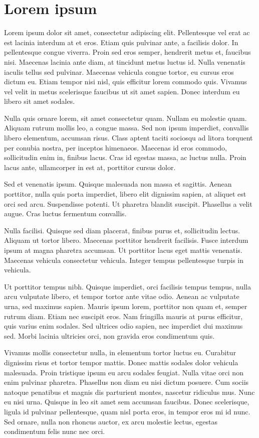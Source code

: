 \chapter{Lorem ipsum}


Lorem ipsum dolor sit amet, consectetur adipiscing elit. Pellentesque vel erat ac est lacinia interdum at et eros. Etiam quis pulvinar ante, a facilisis dolor. In pellentesque congue viverra. Proin sed eros semper, hendrerit metus et, faucibus nisi. Maecenas lacinia ante diam, at tincidunt metus luctus id. Nulla venenatis iaculis tellus sed pulvinar. Maecenas vehicula congue tortor, eu cursus eros dictum eu. Etiam tempor nisi nisl, quis efficitur lorem commodo quis. Vivamus vel velit in metus scelerisque faucibus ut sit amet sapien. Donec interdum eu libero sit amet sodales.

Nulla quis ornare lorem, sit amet consectetur quam. Nullam eu molestie quam. Aliquam rutrum mollis leo, a congue massa. Sed non ipsum imperdiet, convallis libero elementum, accumsan risus. Class aptent taciti sociosqu ad litora torquent per conubia nostra, per inceptos himenaeos. Maecenas id eros commodo, sollicitudin enim in, finibus lacus. Cras id egestas massa, ac luctus nulla. Proin lacus ante, ullamcorper in est at, porttitor cursus dolor.

Sed et venenatis ipsum. Quisque malesuada non massa et sagittis. Aenean porttitor, nulla quis porta imperdiet, libero elit dignissim sapien, at aliquet est orci sed arcu. Suspendisse potenti. Ut pharetra blandit suscipit. Phasellus a velit augue. Cras luctus fermentum convallis.

Nulla facilisi. Quisque sed diam placerat, finibus purus et, sollicitudin lectus. Aliquam ut tortor libero. Maecenas porttitor hendrerit facilisis. Fusce interdum ipsum at magna pharetra accumsan. Ut porttitor lacus eget mattis venenatis. Maecenas vehicula consectetur vehicula. Integer tempus pellentesque turpis in vehicula.

Ut porttitor tempus nibh. Quisque imperdiet, orci facilisis tempus tempus, nulla arcu vulputate libero, et tempor tortor ante vitae odio. Aenean ac vulputate urna, sed maximus sapien. Mauris ipsum lorem, porttitor non quam et, semper rutrum diam. Etiam nec suscipit eros. Nam fringilla mauris at purus efficitur, quis varius enim sodales. Sed ultrices odio sapien, nec imperdiet dui maximus sed. Morbi lacinia ultricies orci, non gravida eros condimentum quis.

Vivamus mollis consectetur nulla, in elementum tortor luctus eu. Curabitur dignissim risus et tortor tempor mattis. Donec mattis sodales dolor vehicula malesuada. Proin tristique ipsum eu arcu sodales feugiat. Nulla vitae orci non enim pulvinar pharetra. Phasellus non diam eu nisi dictum posuere. Cum sociis natoque penatibus et magnis dis parturient montes, nascetur ridiculus mus. Nunc eu nisi urna. Quisque in leo sit amet sem accumsan faucibus. Donec scelerisque, ligula id pulvinar pellentesque, quam nisl porta eros, in tempor eros mi id nunc. Sed ornare, nulla non rhoncus auctor, ex arcu molestie lectus, egestas condimentum felis nunc nec orci.

